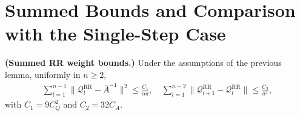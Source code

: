 
\section{Summed Bounds and Comparison with the Single-Step Case}

\begin{corollary}\label{cor:RR-weight-summed}
  \textbf{(Summed RR weight bounds.)}
  Under the assumptions of the previous lemma, uniformly in \(n \ge 2\),
\begin{equation}
\begin{aligned}
  \sum_{l = 1}^{n - 1} \lVert  \mathcal{Q}_l^{\text{RR}} - \overline{A}^{-1}  \rVert^2
    \le \frac{C_1}{\alpha a},
  \quad
  \sum_{l = 1}^{n - 2} \lVert  \mathcal{Q}_{l + 1}^{\text{RR}} - \mathcal{Q}_l^{\text{RR}}  \rVert
    \le \frac{C_2}{a^2},
\end{aligned}
\end{equation}
  with \(C_1 = 9 C_Q^2\) and \(C_2 = 32 \widetilde{C}_A\).
\end{corollary}

\clearpage
